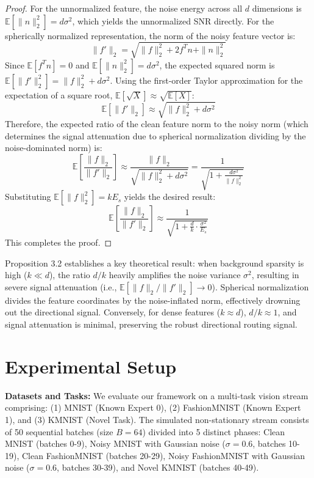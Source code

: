 \documentclass{article}
\theoremstyle{plain}
\theoremstyle{definition}
\theoremstyle{remark}
\begin{document}
\begin{proof}
For the unnormalized feature, the noise energy across all $d$ dimensions is $\mathbb{E}[\|n\|_2^2] = d \sigma^2$, which yields the unnormalized SNR directly.
For the spherically normalized representation, the norm of the noisy feature vector is:
\begin{equation}
\|f'\|_2 = \sqrt{\|f\|_2^2 + 2 f^T n + \|n\|_2^2}
\end{equation}
Since $\mathbb{E}[f^T n] = 0$ and $\mathbb{E}[\|n\|_2^2] = d\sigma^2$, the expected squared norm is $\mathbb{E}[\|f'\|_2^2] = \|f\|_2^2 + d\sigma^2$. Using the first-order Taylor approximation for the expectation of a square root, $\mathbb{E}[\sqrt{X}] \approx \sqrt{\mathbb{E}[X]}$:
\begin{equation}
\mathbb{E}[\|f'\|_2] \approx \sqrt{\|f\|_2^2 + d\sigma^2}
\end{equation}
Therefore, the expected ratio of the clean feature norm to the noisy norm (which determines the signal attenuation due to spherical normalization dividing by the noise-dominated norm) is:
\begin{equation}
\mathbb{E}\left[\frac{\|f\|_2}{\|f'\|_2}\right] \approx \frac{\|f\|_2}{\sqrt{\|f\|_2^2 + d \sigma^2}} = \frac{1}{\sqrt{1 + \frac{d \sigma^2}{\|f\|_2^2}}}
\end{equation}
Substituting $\mathbb{E}[\|f\|_2^2] = k E_s$ yields the desired result:
\begin{equation}
\mathbb{E}\left[\frac{\|f\|_2}{\|f'\|_2}\right] \approx \frac{1}{\sqrt{1 + \frac{d}{k} \cdot \frac{\sigma^2}{E_s}}}
\end{equation}
This completes the proof.
\end{proof}

Proposition 3.2 establishes a key theoretical result: when background sparsity is high ($k \ll d$), the ratio $d/k$ heavily amplifies the noise variance $\sigma^2$, resulting in severe signal attenuation (i.e., $\mathbb{E}[\|f\|_2/\|f'\|_2] \to 0$). Spherical normalization divides the feature coordinates by the noise-inflated norm, effectively drowning out the directional signal. Conversely, for dense features ($k \approx d$), $d/k \approx 1$, and signal attenuation is minimal, preserving the robust directional routing signal.

\section{Experimental Setup}
\label{sec:setup}
\textbf{Datasets and Tasks:} We evaluate our framework on a multi-task vision stream comprising: (1) MNIST \cite{lecun1998gradient} (Known Expert 0), (2) FashionMNIST \cite{xiao2017fashion} (Known Expert 1), and (3) KMNIST \cite{clanuwat2018deep} (Novel Task). The simulated non-stationary stream consists of 50 sequential batches (size $B = 64$) divided into 5 distinct phases: Clean MNIST (batches 0-9), Noisy MNIST with Gaussian noise ($\sigma = 0.6$, batches 10-19), Clean FashionMNIST (batches 20-29), Noisy FashionMNIST with Gaussian noise ($\sigma = 0.6$, batches 30-39), and Novel KMNIST (batches 40-49).
\end{document}
